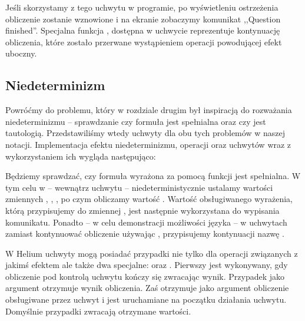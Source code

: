 

Jeśli skorzystamy z tego uchwytu w programie, po wyświetleniu ostrzeżenia obliczenie  zostanie wznowione i na ekranie zobaczymy komunikat ,,Question finished''. Specjalna funkcja , dostępna w uchwycie reprezentuje kontynuację obliczenia, które zostało przerwane wystąpieniem operacji powodującej efekt uboczny.

\subsection{Niedeterminizm}

Powróćmy do problemu, który w rozdziale drugim był inspiracją do rozważania niedeterminizmu -- sprawdzanie czy formuła jest spełnialna oraz czy jest tautologią. Przedstawiliśmy wtedy uchwyty dla obu tych problemów w naszej notacji. Implementacja efektu niedeterminizmu, operacji  oraz uchwytów wraz z wykorzystaniem ich wygląda następująco:




Będziemy sprawdzać, czy formuła wyrażona za pomocą funkcji  jest spełnialna. W tym celu w  -- wewnątrz uchwytu -- niedeterministycznie ustalamy wartości zmiennych , , , po czym obliczamy wartość . Wartość obsługiwanego wyrażenia, którą przypisujemy do zmiennej , jest następnie wykorzystana do wypisania komunikatu. Ponadto -- w celu demonstracji możliwości języka -- w uchwytach zamiast kontynuować obliczenie używając , przypisujemy kontynuacji nazwę .

W Helium uchwyty mogą posiadać przypadki nie tylko dla operacji związanych z jakimś efektem ale także dwa specjalne:  oraz . Pierwszy jest wykonywany, gdy obliczenie pod kontrolą uchwytu kończy się zwracając wynik. Przypadek  jako argument otrzymuje wynik obliczenia. Zaś  otrzymuje jako argument obliczenie obsługiwane przez uchwyt i jest uruchamiane na początku działania uchwytu. Domyślnie przypadki zwracają otrzymane wartości.%


